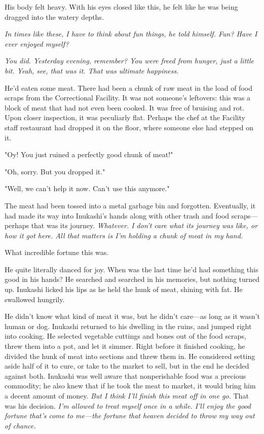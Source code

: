 His body felt heavy. With his eyes closed like this, he felt like he was
being dragged into the watery depths.

\emph{In times like these, I have to think about fun things, he told himself.
Fun? Have I ever enjoyed myself?}

\emph{You did. Yesterday evening, remember? You were freed from hunger, just a
little bit. Yeah, see, that was it. That was ultimate happiness.}

\myspace

He'd eaten some meat. There had been a chunk of raw meat in the load of
food scraps from the Correctional Facility. It was not someone's
leftovers: this was a block of meat that had not even been cooked. It
was free of bruising and rot. Upon closer inspection, it was peculiarly
flat. Perhaps the chef at the Facility staff restaurant had dropped it
on the floor, where someone else had stepped on it.

"Oy! You just ruined a perfectly good chunk of meat!"

"Oh, sorry. But you dropped it."

"Well, we can't help it now. Can't use this anymore."

The meat had been tossed into a metal garbage bin and forgotten.
Eventually, it had made its way into Inukashi's hands along with other
trash and food scraps---perhaps that was its journey. \emph{Whatever. I don't
care what its journey was like, or how it got here. All that matters is
I'm holding a chunk of meat in my hand.}

What incredible fortune this was.

He quite literally danced for joy. When was the last time he'd had
something this good in his hands? He searched and searched in his
memories, but nothing turned up. Inukashi licked his lips as he held the
hunk of meat, shining with fat. He swallowed hungrily.

He didn't know what kind of meat it was, but he didn't care---as long as
it wasn't human or dog. Inukashi returned to his dwelling in the ruins,
and jumped right into cooking. He selected vegetable cuttings and bones
out of the food scraps, threw them into a pot, and let it simmer. Right
before it finished cooking, he divided the hunk of meat into sections
and threw them in. He considered setting aside half of it to cure, or
take to the market to sell, but in the end he decided against both.
Inukashi was well aware that nonperishable food was a precious
commodity; he also knew that if he took the meat to market, it would
bring him a decent amount of money. \emph{But I think I'll finish this meat
off in one go.} That was his decision. \emph{I'm allowed to treat myself once
in a while. I'll enjoy the good fortune that's come to me---the fortune
that heaven decided to throw my way out of chance.}

